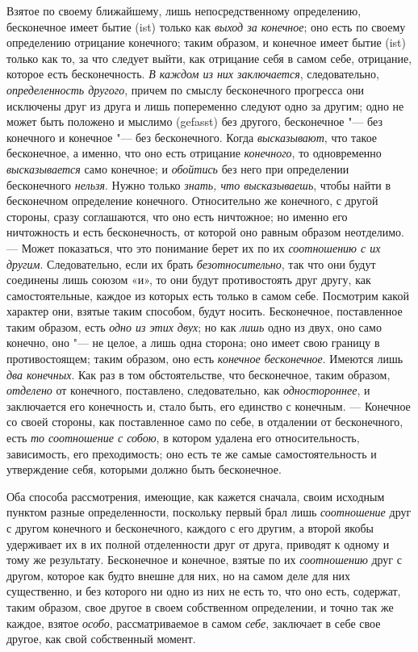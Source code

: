 Взятое по своему ближайшему, лишь непосредственному определению, бесконечное
имеет бытие (ist) только как {\em выход за конечное};
оно есть по своему определению отрицание конечного; таким образом, и
конечное имеет бытие (ist) только как то, за что следует выйти, как
отрицание себя в самом себе, отрицание, которое есть бесконечность.
{\em В каждом из них заключается}, следовательно,
{\em определенность другого}, причем по смыслу
бесконечного прогресса они исключены друг из друга и лишь попеременно
следуют одно за другим; одно не может быть положено и мыслимо (gefasst) без
другого, бесконечное "--- без конечного и конечное "--- без бесконечного. Когда
{\em высказывают}, что такое бесконечное, а именно, что
оно есть отрицание {\em конечного}, то одновременно
{\em высказывается} само конечное; и
{\em обойтись} без него при определении бесконечного
{\em нельзя}. Нужно только
{\em знать, что высказываешь}, чтобы найти в
бесконечном определение конечного. Относительно же конечного, с другой
стороны, сразу соглашаются, что оно есть ничтожное; но именно его
ничтожность и есть бесконечность, от которой оно равным образом неотделимо.
— Может показаться, что это понимание берет их по их
{\em соотношению с их другим}. Следовательно, если их
брать {\em безотносительно}, так что они будут
соединены лишь союзом «и», то они будут противостоять друг другу, как
самостоятельные, каждое из которых есть только в самом себе. Посмотрим
какой характер они, взятые таким способом, будут носить. Бесконечное,
поставленное таким образом, есть {\em одно из этих
двух}; но как {\em лишь} одно из двух, оно само
конечно, оно "--- не целое, а лишь одна сторона; оно имеет свою границу в
противостоящем; таким образом, оно есть {\em конечное
бесконечное}. Имеются лишь {\em два конечных}. Как раз
в том обстоятельстве, что бесконечное, таким образом,
{\em отделено} от конечного, поставлено, следовательно,
как {\em одностороннее}, и заключается его конечность
и, стало быть, его единство с конечным. — Конечное со своей стороны, как
поставленное само по себе, в отдалении от бесконечного, есть
{\em то соотношение с собою}, в котором удалена его
относительность, зависимость, его преходимость; оно есть те же самые
самостоятельность и утверждение себя, которыми должно быть бесконечное.

Оба способа рассмотрения, имеющие, как кажется сначала, своим исходным
пунктом разные определенности, поскольку первый брал лишь
{\em соотношение} друг с другом конечного и
бесконечного, каждого с его другим, а второй якобы удерживает их в их
полной отделенности друг от друга, приводят к одному и тому же результату.
Бесконечное и конечное, взятые по их {\em соотношению}
друг с другом, которое как будто внешне для них, но на самом деле для них
существенно, и без которого ни одно из них не есть то, что оно есть,
содержат, таким образом, свое другое в своем собственном определении, и
точно так же каждое, взятое {\em особо},
рассматриваемое в самом {\em себе}, заключает в себе
свое другое, как свой собственный момент.

